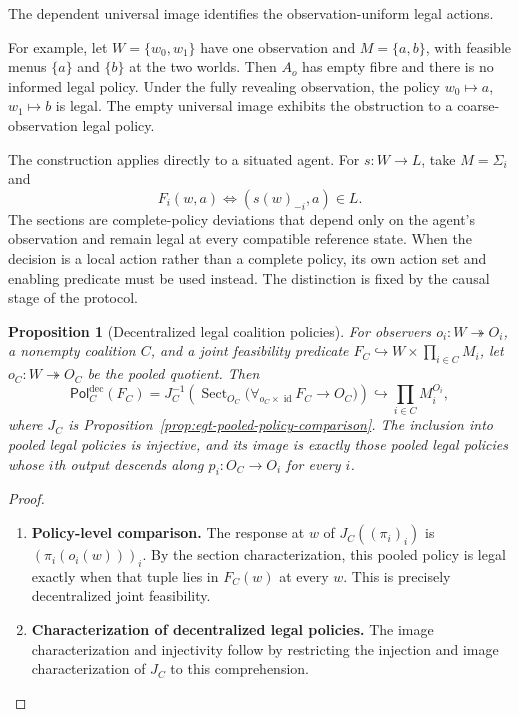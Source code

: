 \documentclass[11pt,a4paper]{article}
\numberwithin{equation}{section}
\newtheorem{proposition}[theorem]{Proposition}
\theoremstyle{definition}
\theoremstyle{remark}
\theoremstyle{plain}
\providecommand{\id}{\mathop{\mathrm{id}}}
\begin{document}
\noindent The dependent universal image identifies the observation-uniform legal actions.
\begin{center}
\end{center}

For example, let $W=\{w_0,w_1\}$ have one observation and
$M=\{a,b\}$, with feasible menus $\{a\}$ and $\{b\}$ at the
two worlds. Then $A_o$ has empty fibre and there is no informed
legal policy. Under the fully revealing observation, the policy
$w_0\mapsto a$, $w_1\mapsto b$ is legal. The empty universal image exhibits the obstruction to a coarse-observation legal policy.

The construction applies directly to a situated agent. For
$s:W\to L$, take $M=\Sigma_i$ and
\[
 F_i(w,a)\iff(s(w)_{-i},a)\in L.
\]
The sections are complete-policy deviations that depend only on the
agent's observation and remain legal at every compatible reference
state. When the decision is a local action rather than a complete policy,
its own action set and enabling predicate must be used instead.
The distinction is fixed by the causal stage of the protocol.

\begin{proposition}[Decentralized legal coalition policies]
\label{prop:egt-decentralized-legal}
For observers $o_i:W\twoheadrightarrow O_i$, a nonempty coalition
$C$, and a joint feasibility predicate
$F_C\hookrightarrow W\times\prod_{i\in C}M_i$, let
$o_C:W\twoheadrightarrow O_C$ be the pooled quotient. Then
\[
 \mathsf{Pol}^{\mathrm{dec}}_C(F_C)
 =
 J_C^{-1}\!\left(
   \operatorname{Sect}_{O_C}
   \bigl(\forall_{o_C\times\operatorname{id}}F_C\to O_C\bigr)
          \right)
 \hookrightarrow\prod_{i\in C}M_i^{O_i},
\]
where $J_C$ is Proposition~\ref{prop:egt-pooled-policy-comparison}.
The inclusion into pooled legal policies is injective, and its
image is exactly those pooled legal policies whose $i$th output
descends along $p_i:O_C\to O_i$ for every $i$.
\end{proposition}
\begin{proof}
\leavevmode
\begin{enumerate}[label=\textup{(\arabic*)},leftmargin=*,itemsep=4pt,topsep=3pt]
  \item \textbf{Policy-level comparison.} The response at $w$ of $J_C((\pi_i)_i)$ is
$(\pi_i(o_i(w)))_i$. By the section characterization, this
pooled policy is legal exactly when that tuple lies in $F_C(w)$
at every $w$. This is precisely decentralized joint feasibility.
  \item \textbf{Characterization of decentralized legal policies.} The image characterization and injectivity follow by restricting
the injection and image characterization of $J_C$ to this
comprehension.
\end{enumerate}
\end{proof}
\end{document}
